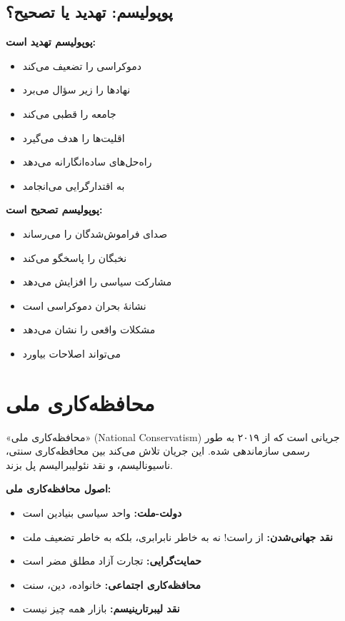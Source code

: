 \subsection{پوپولیسم: تهدید یا تصحیح؟}

\begin{tcolorbox}[
    enhanced,
    colback=leftred!8,
    colframe=leftred,
    boxrule=1.5pt,
    arc=5pt,
    fonttitle=\bfseries,
    title={\rl{🔴 مناظره: پوپولیسم}}
]

\textbf{پوپولیسم تهدید است:}
\begin{itemize}
    \item دموکراسی را تضعیف می‌کند
    \item نهادها را زیر سؤال می‌برد
    \item جامعه را قطبی می‌کند
    \item اقلیت‌ها را هدف می‌گیرد
    \item راه‌حل‌های ساده‌انگارانه می‌دهد
    \item به اقتدارگرایی می‌انجامد
\end{itemize}



\textbf{پوپولیسم تصحیح است:}
\begin{itemize}
    \item صدای فراموش‌شدگان را می‌رساند
    \item نخبگان را پاسخگو می‌کند
    \item مشارکت سیاسی را افزایش می‌دهد
    \item نشانهٔ بحران دموکراسی است
    \item مشکلات واقعی را نشان می‌دهد
    \item می‌تواند اصلاحات بیاورد
\end{itemize}

\end{tcolorbox}

\section{محافظه‌کاری ملی}


«محافظه‌کاری ملی» (National Conservatism) جریانی است که از ۲۰۱۹ به طور رسمی سازماندهی شده. این جریان تلاش می‌کند بین محافظه‌کاری سنتی، ناسیونالیسم، و نقد نئولیبرالیسم پل بزند.

\textbf{اصول محافظه‌کاری ملی:}
\begin{itemize}
    \item \textbf{دولت-ملت:} واحد سیاسی بنیادین است
    \item \textbf{نقد جهانی‌شدن:} از راست! نه به خاطر نابرابری، بلکه به خاطر تضعیف ملت
    \item \textbf{حمایت‌گرایی:} تجارت آزاد مطلق مضر است
    \item \textbf{محافظه‌کاری اجتماعی:} خانواده، دین، سنت
    \item \textbf{نقد لیبرتارینیسم:} بازار همه چیز نیست
\end{itemize}

